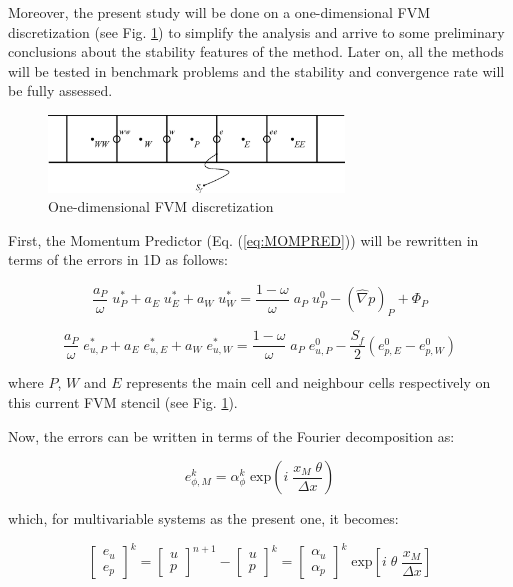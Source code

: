 \documentclass[final,3p,times,10pt,onecolumn]{myElsarticle}
\numberwithin{equation}{section}
\begin{document}
Moreover, the present study will be done on a one-dimensional FVM discretization (see Fig. \ref{fig:4a}) to simplify the analysis and arrive to some preliminary conclusions about the stability features of the method. Later on, all the methods will be tested in benchmark problems and the stability and convergence rate will be fully assessed. 

\begin{figure}[H]
    \centering
    \includegraphics[width=0.7\textwidth]{fig/cells.eps}
    \caption{One-dimensional FVM discretization}
    \label{fig:4a}
\end{figure}

First, the Momentum Predictor (Eq. (\ref{eq:MOMPRED})) will be rewritten in terms of the errors in 1D as follows:

\begin{equation}
    \dfrac{a_P}{\omega} \; u_P^* + a_E \; u_E^* + a_W \; u_W^* = \dfrac{1-\omega}{\omega} \; a_P \; u_P^0 - (\hat{\nabla} p)_P + \Phi_P
\end{equation}

\begin{equation}
    \dfrac{a_P}{\omega} \; e_{u,P}^* + a_E \; e_{u,E}^* + a_W \; e_{u,W}^* = \dfrac{1-\omega}{\omega} \; a_P \; e_{u,P}^0 - \dfrac{S_f}{2} (e^0_{p,E}-e^0_{p,W})
    \label{eq:MPerror}
\end{equation}

\noindent where $P$, $W$ and $E$ represents the main cell and neighbour cells respectively on this current FVM stencil (see Fig. \ref{fig:4a}).

Now, the errors can be written in terms of the Fourier decomposition as:

\begin{equation}
    e^k_{\phi,M} = \alpha^k_{\phi} \; \text{exp} \left(i \; \dfrac{x_M \; \theta}{\Delta x}\right)
    \label{eq:error}
\end{equation}

\noindent which, for multivariable systems as the present one, it becomes:

\begin{equation}
\begin{bmatrix}
e_u \\
e_p 
\end{bmatrix}^{k}
=
\begin{bmatrix}
u \\
p 
\end{bmatrix}^{n+1}
-\begin{bmatrix}
u \\
p 
\end{bmatrix}^{k}
=
\begin{bmatrix}
\alpha_u \\
\alpha_p 
\end{bmatrix}^{k}
\; \text{exp}\left[ i \; \theta \; \frac{x_M}{\Delta x}\right]
\label{eq:fou1}
\end{equation}
\end{document}
